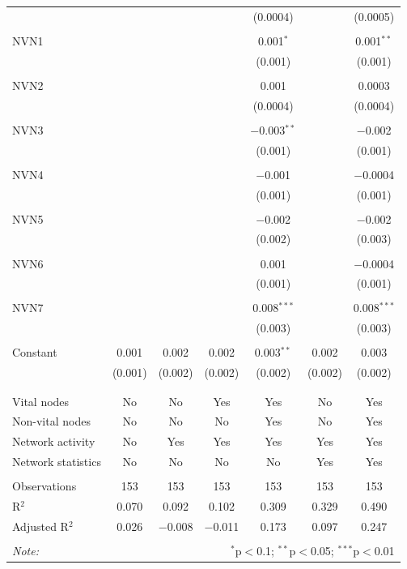 \begin{table}[!htbp]
\begin{tabular}{@{\extracolsep{5pt}}lcccccc}
  &  &  &  & (0.0004) &  & (0.0005) \\ 
  & & & & & & \\ 
 NVN1 &  &  &  & 0.001$^{*}$ &  & 0.001$^{**}$ \\ 
  &  &  &  & (0.001) &  & (0.001) \\ 
  & & & & & & \\ 
 NVN2 &  &  &  & 0.001 &  & 0.0003 \\ 
  &  &  &  & (0.0004) &  & (0.0004) \\ 
  & & & & & & \\ 
 NVN3 &  &  &  & $-$0.003$^{**}$ &  & $-$0.002 \\ 
  &  &  &  & (0.001) &  & (0.001) \\ 
  & & & & & & \\ 
 NVN4 &  &  &  & $-$0.001 &  & $-$0.0004 \\ 
  &  &  &  & (0.001) &  & (0.001) \\ 
  & & & & & & \\ 
 NVN5 &  &  &  & $-$0.002 &  & $-$0.002 \\ 
  &  &  &  & (0.002) &  & (0.003) \\ 
  & & & & & & \\ 
 NVN6 &  &  &  & 0.001 &  & $-$0.0004 \\ 
  &  &  &  & (0.001) &  & (0.001) \\ 
  & & & & & & \\ 
 NVN7 &  &  &  & 0.008$^{***}$ &  & 0.008$^{***}$ \\ 
  &  &  &  & (0.003) &  & (0.003) \\ 
  & & & & & & \\ 
 Constant & 0.001 & 0.002 & 0.002 & 0.003$^{**}$ & 0.002 & 0.003 \\ 
  & (0.001) & (0.002) & (0.002) & (0.002) & (0.002) & (0.002) \\ 
  & & & & & & \\ 
\hline \\[-1.8ex] 
Vital nodes & No & No & Yes & Yes & No & Yes \\ 
Non-vital nodes & No & No & No & Yes & No & Yes \\ 
Network activity & No & Yes & Yes & Yes & Yes & Yes \\ 
Network statistics & No & No & No & No & Yes & Yes \\ 
\hline &  &  &  &  &  &  \\ 
Observations & 153 & 153 & 153 & 153 & 153 & 153 \\ 
R$^{2}$ & 0.070 & 0.092 & 0.102 & 0.309 & 0.329 & 0.490 \\ 
Adjusted R$^{2}$ & 0.026 & $-$0.008 & $-$0.011 & 0.173 & 0.097 & 0.247 \\ 
\hline 
\hline \\[-1.8ex] 
\textit{Note:}  & \multicolumn{6}{r}{$^{*}$p$<$0.1; $^{**}$p$<$0.05; $^{***}$p$<$0.01} \\ 
\end{tabular} 
\end{table} 
